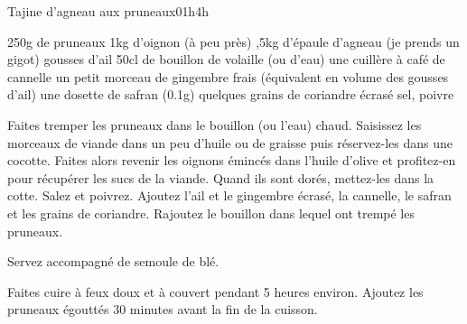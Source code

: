 \begin{recette}{Tajine d'agneau aux pruneaux}{0}{1h}{4h}
\begin{ingredients}
\ingredient 250g de pruneaux
\ingredient 1kg d’oignon (à peu près)
,5kg d’épaule d’agneau (je prends un gigot)
 gousses d'ail
\ingredient 50cl de bouillon de volaille (ou d'eau)
\ingredient une cuillère à café de cannelle
\ingredient un petit morceau de gingembre frais (équivalent en volume des gousses d'ail)
\ingredient une dosette de safran (0.1g)
\ingredient quelques grains de coriandre écrasé
\ingredient sel, poivre
\end{ingredients}

\begin{preparation}
\etape Faites tremper les pruneaux dans le bouillon (ou l'eau) chaud. 
\etape Saisissez les morceaux de viande dans un peu d'huile ou de graisse puis réservez-les dans une cocotte. 
\etape Faites alors revenir les oignons émincés dans l'huile d'olive et profitez-en pour récupérer les sucs de la viande. 
Quand ils sont dorés, mettez-les dans la cotte.
\etape Salez et poivrez. Ajoutez l'ail et le gingembre écrasé, 
la cannelle, le safran et les grains de coriandre.
\etape Rajoutez le bouillon dans lequel ont trempé les pruneaux.
\begin{remarque}
Servez accompagné de semoule de blé.
\end{remarque}
\end{preparation}

\begin{cuisson}
Faites cuire à feux doux et à couvert pendant 5 heures environ. Ajoutez les pruneaux égouttés 30 minutes avant la fin de la
cuisson.
\end{cuisson}

\end{recette}

